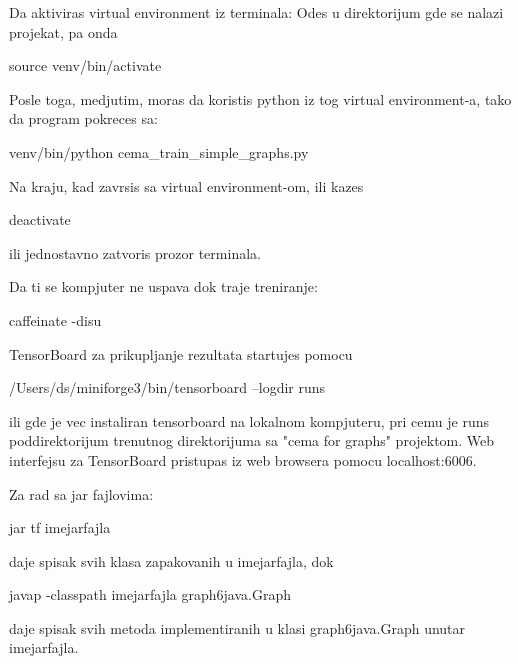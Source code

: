 Da aktiviras virtual environment iz terminala:
Odes u direktorijum gde se nalazi projekat, pa onda

  source venv/bin/activate
  
Posle toga, medjutim, moras da koristis python iz tog virtual environment-a,
tako da program pokreces sa:

  venv/bin/python cema_train_simple_graphs.py
  
Na kraju, kad zavrsis sa virtual environment-om, 
ili kazes

  deactivate
  
ili jednostavno zatvoris prozor terminala.

Da ti se kompjuter ne uspava dok traje treniranje:

  caffeinate -disu

TensorBoard za prikupljanje rezultata startujes pomocu

  /Users/ds/miniforge3/bin/tensorboard --logdir runs

ili gde je vec instaliran tensorboard na lokalnom kompjuteru,
pri cemu je runs poddirektorijum trenutnog direktorijuma sa "cema for graphs" projektom.
Web interfejsu za TensorBoard pristupas iz web browsera pomocu localhost:6006.

Za rad sa jar fajlovima:

  jar tf imejarfajla

daje spisak svih klasa zapakovanih u imejarfajla, dok

  javap -classpath imejarfajla graph6java.Graph

daje spisak svih metoda implementiranih u klasi graph6java.Graph unutar imejarfajla.
